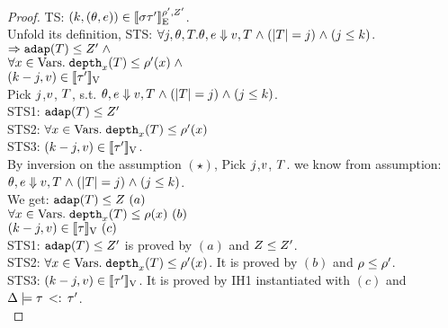 \begin{proof}
TS: $(k, (\theta, e)) \in
 [\![ \sigma \tau' ]\!]_{\text{E}}^{\rho', Z'}$.\\
Unfold its definition, STS:
$ \forall j, \theta, T.  \theta, e \mathrel{\Downarrow} v, T \mathrel{\wedge}
(|T| = j) \mathrel{\wedge} (j \leq k) $.\\
$\Rightarrow \mathtt{adap}(T) \leq Z' \mathrel{\wedge}$\\
$\forall x \in \mbox{Vars}.\;  \mathtt{depth}_{x}(T) \leq \rho'(x)\mathrel{\wedge}$\\
$ (k - j,  v) \in [\![ \tau' ]\!]_{\text{V}}$\\
%
Pick  $j$,$v$,  $T$, s.t.
$\theta, e \mathrel{\Downarrow} v, T \mathrel{\wedge}
(|T| = j) \mathrel{\wedge} (j \leq k) $.\\
STS1: $\mathtt{adap}(T) \leq Z' $ \\
STS2: $\forall x \in \mbox{Vars}.\;  \mathtt{depth}_{x}(T) \leq
\rho'(x)$\\
STS3: $ (k - j,  v) \in [\![ \tau' ]\!]_{\text{V}}  $.\\


By inversion on the assumption $(\star)$, Pick $j$,$v$,
$T$. we know from assumption: $ \theta, e \mathrel{\Downarrow} v, T \mathrel{\wedge}
(|T| = j) \mathrel{\wedge} (j \leq k) $.\\
We get: $\mathtt{adap}(T) \leq Z ~(a)$\\
$\forall x \in \mbox{Vars}.\;  \mathtt{depth}_{x}(T) \leq \rho(x)~(b)$\\
$ (k - j,  v) \in [\![ \tau ]\!]_{\text{V}}~(c)$\\

STS1: $\mathtt{adap}(T) \leq Z' $ is proved by $(a)$ and $Z \leq
Z'$. \\
STS2: $\forall x \in \mbox{Vars}.\;  \mathtt{depth}_{x}(T) \leq
\rho'(x)$. It is proved by $(b)$ and $\rho \leq \rho'$. \\
STS3: $ (k - j,  v) \in [\![ \tau' ]\!]_{\text{V}}$. It is proved by
IH1 instantiated with $(c)$  and $ \Delta \models \tau \, <: \, \tau'$.\\


\end{proof}